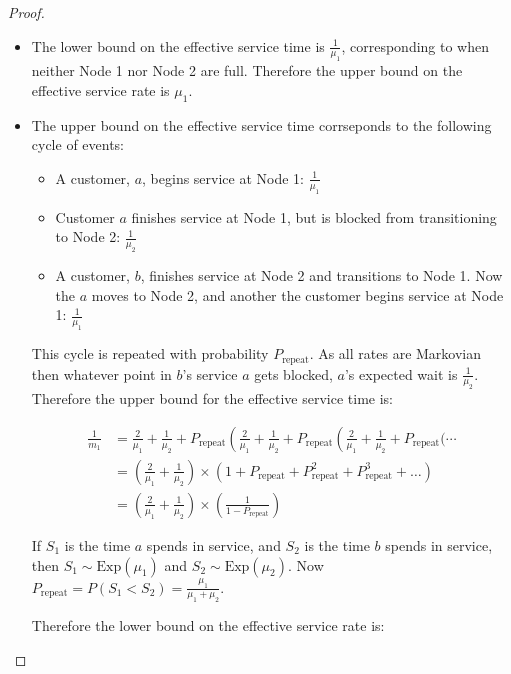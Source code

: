 \documentclass{article}
\numberwithin{equation}{section}
\begin{document}
\begin{proof}
\begin{enumerate}
\begin{itemize}
\begin{itemize}

\item The lower bound on the effective service time is $\frac{1}{\mu_1}$, corresponding to when neither Node 1 nor Node 2 are full.
Therefore the upper bound on the effective service rate is $\mu_1$.

\item The upper bound on the effective service time corrseponds to the following cycle of events:

\begin{itemize}
  \item A customer, $a$, begins service at Node 1: $\frac{1}{\mu_1}$
  \item Customer $a$ finishes service at Node 1, but is blocked from transitioning to Node 2: $\frac{1}{\mu_2}$
  \item A customer, $b$, finishes service at Node 2 and transitions to Node 1. Now the $a$ moves to Node 2, and another the customer begins service at Node 1: $\frac{1}{\mu_1}$
\end{itemize}

This cycle is repeated with probability $P_{\text{repeat}}$.
As all rates are Markovian then whatever point in $b$'s service $a$ gets blocked, $a$'s expected wait is $\frac{1}{\mu_2}$.
Therefore the upper bound for the effective service time is:

\begin{align*}
  \frac{1}{m_1} & = \frac{2}{\mu_1} + \frac{1}{\mu_2} + P_{\text{repeat}} \left( \frac{2}{\mu_1} + \frac{1}{\mu_2} + P_{\text{repeat}} \left( \frac{2}{\mu_1} + \frac{1}{\mu_2} + P_{\text{repeat}} \bigg( \dotsi \right. \right. \\
  & = \left( \frac{2}{\mu_1} + \frac{1}{\mu_2} \right) \times \left( 1 + P_{\text{repeat}} + P_{\text{repeat}}^2 + P_{\text{repeat}}^3 + \dots \right) \\
  & = \left( \frac{2}{\mu_1} + \frac{1}{\mu_2} \right) \times \left( \frac{1}{1 - P_{\text{repeat}}} \right)
\end{align*}

If $S_1$ is the time $a$ spends in service, and $S_2$ is the time $b$ spends in service, then $S_1 \sim \text{Exp}(\mu_1)$ and $S_2 \sim \text{Exp}(\mu_2)$.
Now $P_{\text{repeat}} = P(S_1 < S_2) = \frac{\mu_1}{\mu_1 + \mu_2}$.

Therefore the lower bound on the effective service rate is:


\end{itemize}
\end{itemize}
\end{enumerate}
\end{proof}
\end{document}
